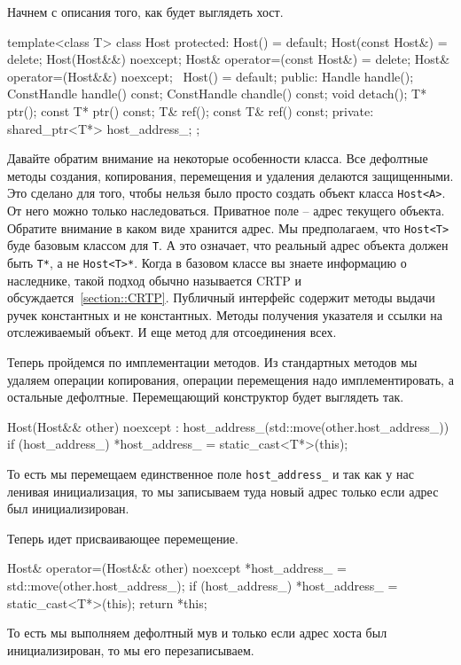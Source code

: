 Начнем с описания того, как будет выглядеть хост.
\begin{cppcode}
template<class T>
class Host {
protected:
  Host() = default;
  Host(const Host&) = delete;
  Host(Host&&) noexcept;
  Host& operator=(const Host&) = delete;
  Host& operator=(Host&&) noexcept;
  ~Host() = default;
public:
  Handle handle();
  ConstHandle handle() const;
  ConstHandle chandle() const;
  void detach();
  T* ptr();
  const T* ptr() const;
  T& ref();
  const T& ref() const;
private:
  shared_ptr<T*> host_address_;
};
\end{cppcode}
Давайте обратим внимание на некоторые особенности класса.
Все дефолтные методы создания, копирования, перемещения и удаления делаются защищенными.
Это сделано для того, чтобы нельзя было просто создать объект класса \verb"Host<A>".
От него можно только наследоваться.
Приватное поле -- адрес текущего объекта.
Обратите внимание в каком виде хранится адрес.
Мы предполагаем, что \verb"Host<T>" буде базовым классом для \verb"T".
А это означает, что реальный адрес объекта должен быть \verb"T*", а не \verb"Host<T>*".
Когда в базовом классе вы знаете информацию о наследнике, такой подход обычно называется CRTP и обсуждается~\ref{section::CRTP}.
Публичный интерфейс содержит методы выдачи ручек константных и не константных.
Методы получения указателя и ссылки на отслеживаемый объект.
И еще метод для отсоединения всех.

Теперь пройдемся по имплементации методов.
Из стандартных методов мы удаляем операции копирования, операции перемещения надо имплементировать, а остальные дефолтные.
Перемещающий конструктор будет выглядеть так.
\begin{cppcode}
  Host(Host&& other) noexcept 
  : host_address_(std::move(other.host_address_)) {
    if (host_address_)
      *host_address_ = static_cast<T*>(this);
  } 
\end{cppcode}
То есть мы перемещаем единственное поле \verb"host_address_" и так как у нас ленивая инициализация, то мы записываем туда новый адрес только если адрес был инициализирован.

Теперь идет присваивающее перемещение.
\begin{cppcode}
Host& operator=(Host&& other) noexcept {
  *host_address_ = std::move(other.host_address_);
  if (host_address_)
    *host_address_ = static_cast<T*>(this);
  return *this;
}
\end{cppcode}
То есть мы выполняем дефолтный мув и только если адрес хоста был инициализирован, то мы его перезаписываем.

